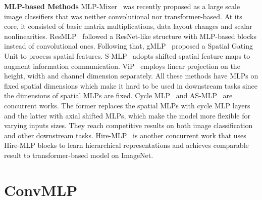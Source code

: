 \documentclass[final]{cvpr}
\begin{document}
\noindent \textbf{MLP-based Methods} MLP-Mixer~\cite{tolstikhin2021mlp} was recently proposed as a large scale image classifiers that was neither convolutional nor transformer-based. At its core, it consisted of basic matrix multiplications, data layout changes and scalar nonlinearities. ResMLP~\cite{touvron2021resmlp} followed a ResNet-like structure with MLP-based blocks instead of convolutional ones. Following that, gMLP~\cite{liu2021pay} proposed a Spatial Gating Unit to process spatial features. S-MLP~\cite{yu2021s} adopts shifted spatial feature maps to augment information communication. ViP~\cite{hou2021vision} employs linear projection on the height, width and channel dimension separately. All these methods have MLPs on fixed spatial dimensions which make it hard to be used in downstream tasks since the dimensions of spatial MLPs are fixed. Cycle MLP~\cite{chen2021cyclemlp} and AS-MLP~\cite{lian2021mlp} are concurrent works. The former replaces the spatial MLPs with cycle MLP layers and the latter with axial shifted MLPs, which make the model more flexible for varying inputs sizes. They reach competitive results on both image classification and other downstream tasks. Hire-MLP~\cite{guo2021hire} is another concurrent work that uses Hire-MLP blocks to learn hierarchical representations and achieves comparable result to transformer-based model on ImageNet.

\section{ConvMLP}
\end{document}
